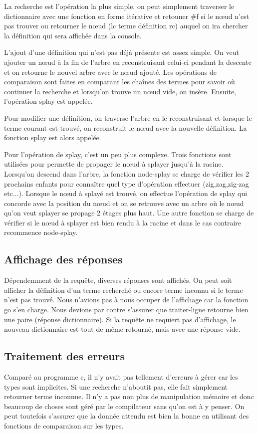 \documentclass{article}
\begin{document}
  La recherche est l'opération la plus simple, on peut simplement traverser le
  dictionnaire avec une fonction en forme itérative et retouner \#f si le nœud
  n'est pas trouver ou retourner le nœud (lc terme définition rc) auquel on ira
  chercher la définition qui sera affichée dans la console.

  L'ajout d'une définition qui n'est pas déjà présente est assez simple. On veut
  ajouter un nœud à la fin de l'arbre en reconstruisant celui-ci  pendant la
  descente et on retourne le nouvel arbre avec le nœud ajouté. Les opérations de
  comparaison sont faites en comparant les chaînes des termes pour savoir où
  continuer la recherche et lorsqu'on trouve un nœud vide, on insère. Ensuite,
  l'opération splay est appelée.

  Pour modifier une définition, on traverse l'arbre en le reconstruisant et
  lorsque le terme courant est trouvé, on reconstruit le nœud avec la nouvelle
  définition. La fonction splay est alors appelée.

  Pour l'opération de splay, c'est un peu plus complexe. Trois fonctions sont
  utilisées pour permette de propager le nœud à splayer jusqu'à la racine.
  Lorsqu'on descend dans l'arbre, la fonction node-splay se charge de vérifier
  les 2 prochains enfants pour connaître quel type d'opération effectuer
  (zig,zag,zig-zag etc...). Lorsque le nœud à splayé est trouvé, on effectue
  l'opération de splay qui concorde avec la position du nœud et on se retrouve
  avec un arbre où le nœud qu'on veut splayer se propage 2 étages plus haut. Une
  autre fonction se charge de vérifier si le nœud à splayer est bien rendu à la
  racine et dans le cas contraire recommence node-splay.

  \subsection{Affichage des réponses}
  Dépendemment de la requête, diverses réponses sont affichés. On peut soit
  afficher la définition d'un terme recherché ou encore terme inconnu si le
  terme n'est pas trouvé. Nous n'avions pas à nous occuper de l'affichage car la
  fonction go s'en charge. Nous devions par contre s'assurer que traiter-ligne
  retourne bien une paire (réponse dictionnaire). Si la requête ne requiert pas
  d'affichage, le nouveau dictionnaire est tout de même retourné, mais avec une
  réponse vide.

  \subsection{Traitement des erreurs}
  Comparé au programme c, il n'y avait pas tellement d'erreurs à gérer car les
  types sont implicites. Si une recherche n'aboutit pas, elle fait simplement
  retourner terme inconnue. Il n'y a pas non plus de manipulation mémoire et
  donc beaucoup de choses sont géré par le compilateur sans qu'on est à y
  penser. On peut toutefois s'assurer que la donnée attendu est bien la bonne en
  utilisant des fonctions de comparaison sur les types.
\end{document}
